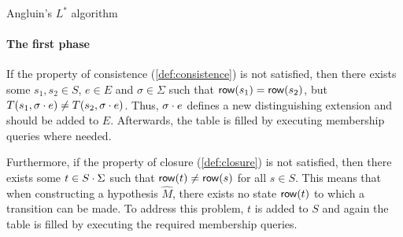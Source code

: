 \begin{algorithm}[h]
\caption{Angluin's $L^*$ algorithm}
\label{alg:lstar}
\end{algorithm}

\paragraph{The first phase} If the property of consistence (\cref{def:consistence}) is not
satisfied, then there exists some $s_1,s_2 \in S$, $e \in E$ and
$\sigma \in \Sigma$ such that $\mathsf{row}(s_1) = \mathsf{row}(s_2)$, but
$T(s_1,\sigma\cdot e) \neq T(s_2,\sigma\cdot e)$. Thus, $\sigma\cdot e$
defines a new distinguishing extension and should be added to $E$.
Afterwards, the table is filled by executing membership queries where needed.

Furthermore, if the property of closure (\cref{def:closure}) is
not satisfied, then there exists some $t \in S \cdot \Sigma$ such that
$\mathsf{row}(t) \neq \mathsf{row}(s)$ for all $s \in S$. This means that when constructing a
hypothesis $\hat M$, there exists no state $\mathsf{row}(t)$ to which a transition can
be made. To address this problem, $t$ is added to $S$ and again the table is
filled by executing the required membership queries.

